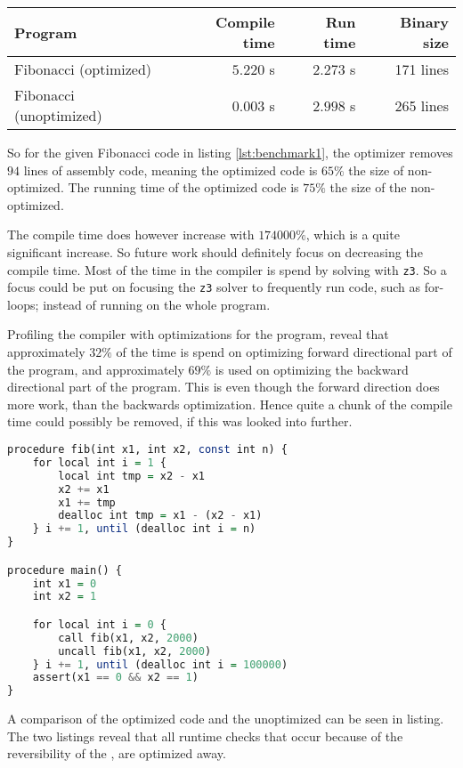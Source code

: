 \begin{table}[H]
    \centering
    \begin{tabular}{|l|r|r|r|}
        \hline
        Program                 & Compile time & Run time  & Binary size \\
        \hline
        Fibonacci (optimized)   & $5.220$ s    & $2.273$ s & 171 lines \\
        \hline
        Fibonacci (unoptimized) & $0.003$ s    & $2.998$ s & 265 lines \\
        \hline
    \end{tabular}
    \label{table:benchmark-results}
\end{table}
\noindent
So for the given Fibonacci code in listing \ref{lst:benchmark1}, the optimizer removes
$94$ lines of assembly code, meaning the optimized code is $65\%$ the size of non-optimized.
The running time of the optimized code is $75\%$ the size of the non-optimized.

The compile time does however increase with $174000\%$, which is a quite significant increase.
So future work should definitely focus on decreasing the compile time. Most of the time in the
\lan compiler is spend by solving with \texttt{z3}. So a focus could be put on focusing
the \texttt{z3} solver to frequently run code, such as for-loops; instead of running on the
whole program.

Profiling the compiler with optimizations for the program, reveal that approximately
$32\%$ of the time is spend on optimizing forward directional part of the program, and
approximately $69\%$ is used on optimizing the backward directional part of the program.
This is even though the forward direction does more work, than the backwards optimization.
Hence quite a chunk of the compile time could possibly be removed, if this was looked into
further.

\begin{lstlisting}[language=Haskell, label={lst:benchmark1},
    caption={Fibonacci program used for benchmarking \lan code generation.}]
procedure fib(int x1, int x2, const int n) {
    for local int i = 1 {
        local int tmp = x2 - x1
        x2 += x1
        x1 += tmp
        dealloc int tmp = x1 - (x2 - x1)
    } i += 1, until (dealloc int i = n)
}

procedure main() {
    int x1 = 0
    int x2 = 1

    for local int i = 0 {
        call fib(x1, x2, 2000)
        uncall fib(x1, x2, 2000)
    } i += 1, until (dealloc int i = 100000)
    assert(x1 == 0 && x2 == 1)
}
\end{lstlisting}
\noindent
A comparison of the optimized code and the unoptimized can be seen in listing.
The two listings reveal that all runtime checks that occur because of the reversibility of
the \lan, are optimized away.

